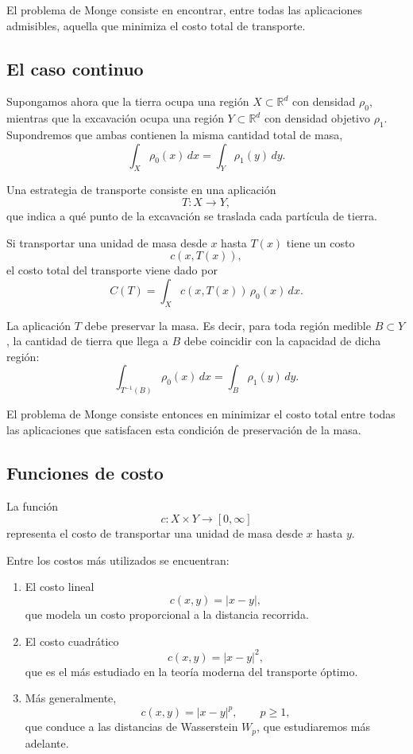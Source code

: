 \documentclass[12pt, a4paper]{amsbook}
\theoremstyle{remark}
\theoremstyle{definition}
\numberwithin{section}{chapter}
\numberwithin{subsection}{section}
\numberwithin{equation}{section}
\numberwithin{figure}{chapter}
\begin{document}
El problema de Monge consiste en encontrar, entre todas las aplicaciones admisibles, aquella que minimiza el costo total de transporte.

\subsection{El caso continuo}

Supongamos ahora que la tierra ocupa una región \(X\subset\mathbb{R}^d\) con densidad \(\rho_0\), mientras que la excavación ocupa una región \(Y\subset\mathbb{R}^d\) con densidad objetivo \(\rho_1\). Supondremos que ambas contienen la misma cantidad total de masa,
\[
\int_X \rho_0(x)\,dx
=
\int_Y \rho_1(y)\,dy.
\]

Una estrategia de transporte consiste en una aplicación
\[
T\colon X\longrightarrow Y,
\]
que indica a qué punto de la excavación se traslada cada partícula de tierra.

Si transportar una unidad de masa desde \(x\) hasta \(T(x)\) tiene un costo
\[
c(x,T(x)),
\]
el costo total del transporte viene dado por
\[
C(T)=\int_X c(x,T(x))\,\rho_0(x)\,dx.
\]

La aplicación \(T\) debe preservar la masa. Es decir, para toda región medible \(B\subset Y\), la cantidad de tierra que llega a \(B\) debe coincidir con la capacidad de dicha región:
\[
\int_{T^{-1}(B)} \rho_0(x)\,dx
=
\int_B \rho_1(y)\,dy.
\]

El problema de Monge consiste entonces en minimizar el costo total entre todas las aplicaciones que satisfacen esta condición de preservación de la masa.

\subsection{Funciones de costo}
La función
\[
c:X\times Y\to[0,\infty]
\]
representa el costo de transportar una unidad de masa desde \(x\) hasta \(y\).

Entre los costos más utilizados se encuentran:

\begin{enumerate}
\item El costo lineal
\[
c(x,y)=|x-y|,
\]
que modela un costo proporcional a la distancia recorrida.

\item El costo cuadrático
\[
c(x,y)=|x-y|^2,
\]
que es el más estudiado en la teoría moderna del transporte óptimo.

\item Más generalmente,
\[
c(x,y)=|x-y|^p,
\qquad p\ge1,
\]
que conduce a las distancias de Wasserstein \(W_p\), que estudiaremos más adelante.
\end{enumerate}
\end{document}
